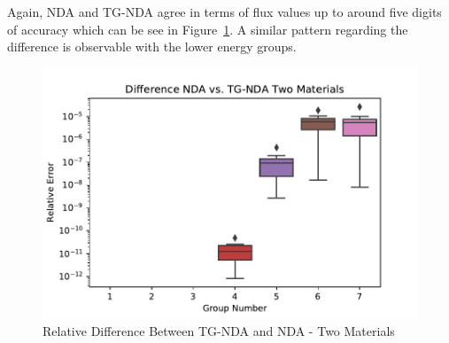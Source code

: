 Again, NDA and TG-NDA agree in terms of flux values up to around five digits of accuracy which can be see in Figure~\ref{fig:TwoMatErr}. A similar pattern regarding the difference is observable with the lower energy groups.

\begin{figure}[H]
    \centering
    \includegraphics[width=.75\textwidth]{fig/TwoMatErr.pdf}
    \caption{Relative Difference Between TG-NDA and NDA  - Two Materials}
    \label{fig:TwoMatErr}
\end{figure}




